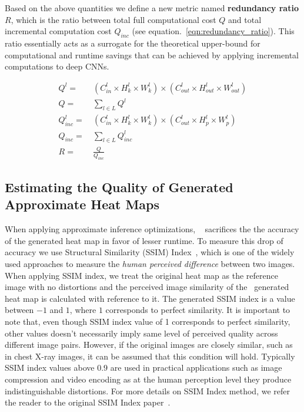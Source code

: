 Based on the above quantities we define a new metric named \textbf{redundancy ratio} $R$, which is the ratio between total full computational cost $Q$ and total incremental computation cost $Q_{inc}$ (see equation.~\ref{eqn:redundancy_ratio}). This ratio essentially acts as a surrogate for the theoretical upper-bound for computational and runtime savings that can be achieved by applying incremental computations to deep CNNs.

\begin{align}
\label{eqn:full_local}
Q^l =&~ (C^l_{in} \times H^l_{k} \times W^l_{k}) \times (C^l_{out} \times H^l_{out} \times W^l_{out})\\
\label{eqn:full_all}
Q =&~ \sum_{l \in L} Q^l\\
\label{eqn:inc_local}
Q_{inc}^l =&~ (C^l_{in} \times H^l_{k} \times W^l_{k}) \times (C^l_{out} \times H^l_{p} \times W^l_{p})\\
\label{eqn:inc_all}
Q_{inc} =&~ \sum_{l \in L} Q^l_{inc}\\
\label{eqn:redundancy_ratio}
R =&~ \frac{Q}{Q_{inc}}
\end{align}


\subsection{Estimating the Quality of Generated Approximate Heat Maps}

When applying approximate inference optimizations, \system~ sacrifices the the accuracy of the generated heat map in favor of lesser runtime.
To measure this drop of accuracy we use Structural Similarity (SSIM) Index~\cite{wang2004image}, which is one of the widely used approaches to measure the \textit{human perceived difference} between two images.
When applying SSIM index, we treat the original heat map as the reference image with no distortions and the perceived image similarity of the \system~generated heat map is calculated with reference to it.
The generated SSIM index is a value between $-1$ and $1$, where $1$ corresponds to perfect similarity.
It is important to note that, even though SSIM index value of 1 corresponds to perfect similarity, other values doesn't necessarily imply same level of perceived quality across different image pairs.
However, if the original images are closely similar, such as in chest X-ray images, it can be assumed that this condition will hold.
Typically SSIM index values above $0.9$ are used in practical applications such as image compression and video encoding as at the human perception level they produce indistinguishable distortions.
For more details on SSIM Index method, we refer the reader to the original SSIM Index paper~\cite{wang2004image}.